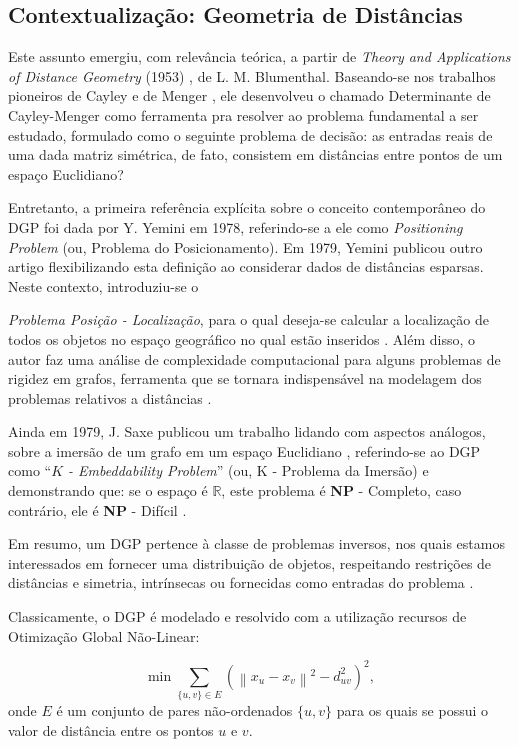 \documentclass[11pt]{article}
\begin{document}
\subsection{Contextualização: Geometria de Distâncias}

Este assunto emergiu, com relevância teórica, a partir de {\emph{Theory and Applications of Distance Geometry}} (1953) \cite{Blumenthal:53}, de L. M. Blumenthal. Baseando-se nos trabalhos pioneiros de Cayley \cite{Cayley:1841} e de Menger \cite{Menger:31}, ele desenvolveu o chamado Determinante de Cayley-Menger como ferramenta pra resolver ao problema fundamental a ser estudado, formulado como o seguinte problema de decisão: as entradas reais de uma dada matriz simétrica, de fato, consistem em distâncias entre pontos de um espaço Euclidiano? \cite{Survey:12}

Entretanto, a primeira referência explícita sobre o conceito contemporâneo do DGP foi dada por Y. Yemini em 1978, referindo-se a ele como {\emph{Positioning Problem}} (ou, Problema do Posicionamento). Em 1979, Yemini publicou outro artigo flexibilizando esta definição ao considerar dados de distâncias esparsas. Neste contexto, introduziu-se o {\emph{Problema Posição - Localização}, para o qual deseja-se calcular a localização de todos os objetos no espaço geográfico no qual estão inseridos \cite{Yemini:79,Survey:12}. Além disso, o autor faz uma análise de complexidade computacional para alguns problemas de rigidez em grafos, ferramenta que se tornara indispensável na modelagem dos problemas relativos a distâncias \cite{Survey:12}.
	
Ainda em 1979, J. Saxe publicou um trabalho lidando com aspectos análogos, sobre a imersão de um grafo em um espaço Euclidiano \cite{Saxe:79}, referindo-se ao DGP como ``{\emph{$K$ - Embeddability Problem}}'' (ou, K - Problema da Imersão) e demonstrando que: se o espaço é $\mathbb{R}$, este problema é {\bf NP} - Completo, caso contrário, ele é {\bf NP} - Difícil \cite{Survey:12}.

Em resumo, um DGP pertence à classe de problemas inversos, nos quais estamos interessados em fornecer uma distribuição de objetos, respeitando restrições de distâncias e simetria, intrínsecas ou fornecidas como entradas do problema \cite{Havel:95}.

Classicamente, o DGP é modelado e resolvido com a utilização recursos de Otimização Global Não-Linear:

\begin{equation}
\min \displaystyle \sum_{\{u,v\} \in E} \left( \left\| x_{u} - x_{v} \right\|^{2} - d^{2}_{uv} \right)^{2},  \label{eq:DGPpmform}
\end{equation}
onde $E$ é um conjunto de pares não-ordenados $\{ u,v \}$ para os quais se possui o valor de distância entre os pontos $u$ e $v$.

}
\end{document}
